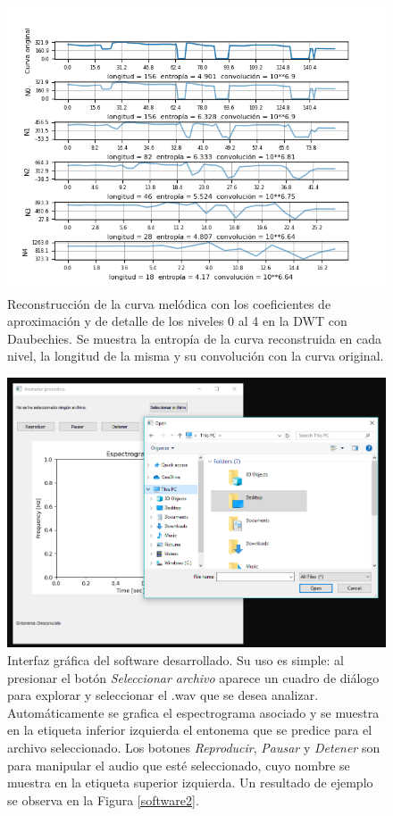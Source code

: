 \begin{figure}
\begin{center}
\includegraphics[width= 1\columnwidth]{Graphics/reconstruccion}
\caption{Reconstrucci\'on de la curva mel\'odica con los coeficientes de aproximaci\'on y de detalle de los niveles 0 al 4 en la DWT con Daubechies. Se muestra la entrop\'ia de la curva reconstruida en cada nivel, la longitud de la misma y su convoluci\'on con la curva original.}
\label{reconstruccion}
\end{center}
\end{figure}


\begin{figure}
\begin{center}
\includegraphics[width= 1\columnwidth]{Graphics/software}
\caption{Interfaz gr\'afica del software desarrollado. Su uso es simple: al presionar el bot\'on \emph{Seleccionar archivo} aparece un cuadro de di\'alogo para explorar y seleccionar el .wav que se desea analizar. Autom\'aticamente se grafica el espectrograma asociado y se muestra en la etiqueta inferior izquierda el entonema que se predice para el archivo seleccionado. Los botones \emph{Reproducir}, \emph{Pausar} y \emph{Detener} son para manipular el audio que est\'e seleccionado, cuyo nombre se muestra en la etiqueta superior izquierda. Un resultado de ejemplo se observa en la Figura \ref{software2}.}
\label{software}
\end{center}
\end{figure}

